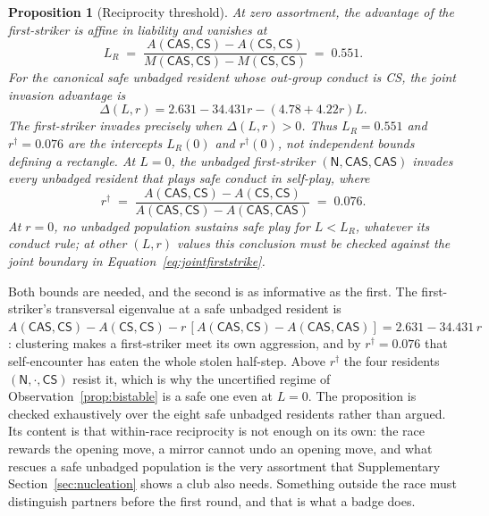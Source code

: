 \documentclass[preprint,12pt]{elsarticle}
\theoremstyle{plain}
\newtheorem{proposition}[theorem]{Proposition}
\theoremstyle{definition}
\newcommand{\CS}{\textsf{CS}}
\newcommand{\CAS}{\textsf{CAS}}
\begin{document}
\begin{proposition}[Reciprocity threshold]
\label{prop:reciprocity}
At zero assortment, the advantage of the first-striker is affine in liability
and vanishes at
\begin{equation}
\label{eq:LR}
L_R \;=\; \frac{A(\CAS, \CS) - A(\CS, \CS)}{M(\CAS, \CS) - M(\CS, \CS)}
      \;=\; 0.551 .
\end{equation}
For the canonical safe unbadged resident whose out-group conduct is \CS{}, the
joint invasion advantage is
\begin{equation}
\label{eq:jointfirststrike}
\Delta(L,r) = 2.631 - 34.431r - (4.78 + 4.22r)L .
\end{equation}
The first-striker invades precisely when $\Delta(L,r)>0$. Thus
$L_R=0.551$ and $r^{\dagger}=0.076$ are the intercepts $L_R(0)$ and
$r^{\dagger}(0)$, not independent bounds defining a rectangle. At $L=0$,
the unbadged first-striker $(\mathsf{N}, \CAS, \CAS)$ invades every unbadged
resident that plays safe conduct in self-play, where
\begin{equation}
\label{eq:rdagger}
r^{\dagger} \;=\; \frac{A(\CAS, \CS) - A(\CS, \CS)}{A(\CAS, \CS) - A(\CAS, \CAS)}
      \;=\; 0.076 .
\end{equation}
At $r=0$, no unbadged population sustains safe play for $L<L_R$, whatever its
conduct rule; at other $(L,r)$ values this conclusion must be checked against
the joint boundary in Equation~\eqref{eq:jointfirststrike}.
\end{proposition}

Both bounds are needed, and the second is as informative as the first. The
first-striker's transversal eigenvalue at a safe unbadged resident is
$A(\CAS, \CS) - A(\CS, \CS) - r\,[A(\CAS, \CS) - A(\CAS, \CAS)]
 = 2.631 - 34.431\,r$: clustering makes a first-striker meet its own aggression,
and by $r^{\dagger} = 0.076$ that self-encounter has eaten the whole stolen
half-step. Above $r^{\dagger}$ the four residents $(\mathsf{N}, \cdot, \CS)$
resist it, which is why the uncertified regime of
Observation~\ref{prop:bistable} is a safe one even at $L = 0$. The proposition
is checked exhaustively over the eight safe unbadged residents rather than
argued. Its content is that within-race reciprocity is not enough on its own:
the race rewards the opening move, a mirror cannot undo an opening move, and
what rescues a safe unbadged population is the very assortment that
Supplementary Section~\ref{sec:nucleation} shows a club also needs. Something outside the
race must distinguish partners before the first round, and that is what a badge
does.
\end{document}
